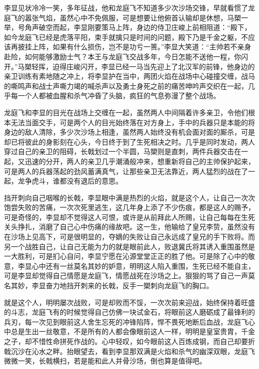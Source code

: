 李显见状冷冷一笑，多年征战，他和龙庭飞不知道多少次沙场交锋，早就看惯了龙庭飞的嚣张气焰，虽然心中不免佩服，可是想要让他俯首认输却是休想，马槊一举，号角声破空而起，李显刚要策马上阵，身边的侍卫庄峻上前相阻道：“殿下，如今龙庭飞已经是虎落平阳，束手就擒只是时间的问题，殿下乃是千金之躯，不应该再披挂上阵，如果有什么损伤，岂不是功亏一篑。”李显大笑道：“主帅若不亲身赴险，如何能够激励士气？本王与龙庭飞交战多年，今日怎能不送他一程，你闪开。”马槊轻挥，迫得庄峻闪开，李显已经一马当先迎上了北汉军的前锋，他身边的亲卫训练有素地随之冲上，将李显护在当中，两团火焰在战场中心碰撞交缠，战马的嘶鸣声和战士声嘶力竭的喊杀声以及勇士身死之前的痛苦呻吟声交织在一起，几乎每一个人都被血腥和杀气冲昏了头脑，疯狂的气息弥漫了整个战场。

龙庭飞和李显的目光在战场上交缠在一起，虽然两人中间隔着许多亲卫，令他们根本无法当面交手，可是两个人的目光始终落在对方身上，手中的兵器只是本能的将身边的敌人清除，多少次沙场上相逢，虽然两人始终没有机会面对面的厮杀，可是却已将彼此的身影刻在心头，今日终于到了生死相决之时。几乎是同时发动，两人穿过自己的亲卫的阻碍，长戟划过一个半圆，马槊则是直刺，两件兵器交击在一起，又迅速的分开，两人的亲卫几乎潮涌般冲来，想重新将自己的主帅保护起来，可是两人的兵器荡起的劲风蓄满真气，让那些亲卫无法靠近，两人猛烈的战在了一起，龙争虎斗，谁都没有退后的意思。

挡开刺向自己咽喉的长戟，李显眼中满是热烈的火焰，就是这个人，让自己一次次饱尝失败的苦痛，一次次死里逃生，这几年身上添了不少伤痕，都是这人的赐予，可是奇怪的，李显却不觉得这人可恨，或许是从前拜此人所赐，让自己每每在生死关头挣扎，消磨了自己心中伤痛的缘故吧。这一生，他输给了皇兄李贽，虽然没有在沙场上见高下，可是很明显的，夺嫡的失败让自己永远成了皇兄的手下败将。而另一个战胜自己，让自己无能为力的就是眼前此人，败退冀氏将其诱入重围虽然是一大胜利，可是扪心自问，李显宁愿在沁源堂堂正正的胜了他。可是除了心中的敬意，李显心中还有一丝莫名其妙的妒意，明明这人陷入重围，生死已经不能自主，可是李显却觉得自己情愿是龙庭飞，情愿战死在沙场之上。狠狠的骂了自己一声莫名其妙，李显奋力地挡开刺来的长戟，反手一槊刺向龙庭飞的胸口。

就是这个人，明明屡次战败，可是却败而不馁，一次次前来迎战，始终保持着旺盛的斗志，龙庭飞有的时候觉得自己仿佛一块试金石，将眼前这人磨砺成了最锋利的兵刃，每一次见到眼前这人舍生忘死的冲锋陷阵，悍不畏死地断后血战，龙庭飞心中总是生出一丝敬意，不是所有的人都会像眼前这人一样，明明是皇室贵胄，千金之子，却不惜性命拼死作战的。心中轻叹，如今眼前这人百炼成钢，而自己却要折戟沉沙在沁水之畔。抬眼望去，看到李显那双满是火焰和杀气的幽深双眼，龙庭飞微微一笑，长戟横扫，若是能和此人并骨沙场，倒也算是值得吧。

